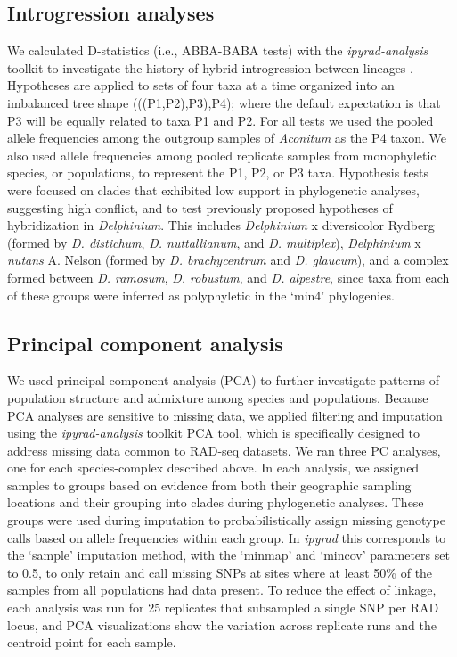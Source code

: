 \documentclass[11pt]{article}
\begin{document}
\subsection{Introgression analyses}
We calculated D-statistics (i.e., ABBA-BABA tests) with the \emph{ipyrad-analysis} 
toolkit to investigate the history of hybrid introgression between lineages 
\citep{durand_2011}.
Hypotheses are applied to sets of four taxa at a time organized into an imbalanced
tree shape (((P1,P2),P3),P4); where the default expectation is that P3 will be equally
related to taxa P1 and P2. For all tests we used the pooled allele frequencies among 
the outgroup samples of \emph{Aconitum} as the P4 taxon. We also used allele frequencies 
among pooled replicate samples from monophyletic species, or populations, to represent 
the P1, P2, or P3 taxa. Hypothesis tests were focused on clades that exhibited low 
support in phylogenetic analyses, suggesting high conflict, and to test previously 
proposed hypotheses of hybridization in \emph{Delphinium}. 
This includes \emph{Delphinium} x diversicolor Rydberg 
(formed by \emph{D. distichum}, \emph{D. nuttallianum}, and \emph{D. multiplex}), 
\emph{Delphinium} x \emph{nutans} A. Nelson (formed by \emph{D. brachycentrum} and \emph{D. glaucum}),
and a complex formed between \emph{D. ramosum}, \emph{D. robustum}, and \emph{D. alpestre},
since taxa from each of these groups were inferred as polyphyletic in the `min4’
phylogenies.


\subsection{Principal component analysis}
We used principal component analysis (PCA) to further investigate patterns of
population structure and admixture among species and populations. Because PCA 
analyses are sensitive to missing data, we applied filtering and imputation 
using the \emph{ipyrad-analysis} toolkit PCA tool, which is specifically 
designed to address missing data common to RAD-seq datasets. 
% 
We ran three PC analyses, one for each species-complex described above. 
In each analysis, we assigned samples to groups based on evidence from 
both their geographic sampling locations and their grouping into clades 
during phylogenetic analyses. These groups were used during imputation to 
probabilistically assign missing genotype calls based on allele frequencies
within each group. In \emph{ipyrad} this corresponds to the ‘sample’ imputation
method, with the ‘minmap’ and ‘mincov’ parameters set to 0.5, to only retain 
and call missing SNPs at sites where at least 50\% of the samples from all 
populations had data present. 
To reduce the effect of linkage, each analysis was run for 25 replicates
that subsampled a single SNP per RAD locus, and PCA visualizations show 
the variation across replicate runs and the centroid point for each sample.
\end{document}
